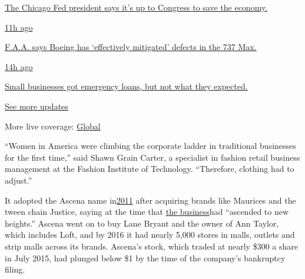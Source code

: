 \href{https://www.nytimes3xbfgragh.onion/live/2020/08/03/business/stock-market-today-coronavirus?action=click\&pgtype=Article\&state=default\&region=MAIN_CONTENT_1\&context=storylines_live_updates\#the-chicago-fed-president-says-its-up-to-congress-to-save-the-economy}{The
Chicago Fed president says it's up to Congress to save the economy.}

\href{https://www.nytimes3xbfgragh.onion/live/2020/08/03/business/stock-market-today-coronavirus?action=click\&pgtype=Article\&state=default\&region=MAIN_CONTENT_1\&context=storylines_live_updates\#faa-says-boeing-has-effectively-mitigated-defects-in-the-737-max}{11h
ago}

\href{https://www.nytimes3xbfgragh.onion/live/2020/08/03/business/stock-market-today-coronavirus?action=click\&pgtype=Article\&state=default\&region=MAIN_CONTENT_1\&context=storylines_live_updates\#faa-says-boeing-has-effectively-mitigated-defects-in-the-737-max}{F.A.A.
says Boeing has `effectively mitigated' defects in the 737 Max.}

\href{https://www.nytimes3xbfgragh.onion/live/2020/08/03/business/stock-market-today-coronavirus?action=click\&pgtype=Article\&state=default\&region=MAIN_CONTENT_1\&context=storylines_live_updates\#small-businesses-got-emergency-loans-but-not-what-they-expected}{14h
ago}

\href{https://www.nytimes3xbfgragh.onion/live/2020/08/03/business/stock-market-today-coronavirus?action=click\&pgtype=Article\&state=default\&region=MAIN_CONTENT_1\&context=storylines_live_updates\#small-businesses-got-emergency-loans-but-not-what-they-expected}{Small
businesses got emergency loans, but not what they expected.}

\href{https://www.nytimes3xbfgragh.onion/live/2020/08/03/business/stock-market-today-coronavirus?action=click\&pgtype=Article\&state=default\&region=MAIN_CONTENT_1\&context=storylines_live_updates}{See
more updates}

More live coverage:
\href{https://www.nytimes3xbfgragh.onion/2020/08/03/world/coronavirus-covid-19.html?action=click\&pgtype=Article\&state=default\&region=MAIN_CONTENT_1\&context=storylines_live_updates}{Global}

``Women in America were climbing the corporate ladder in traditional
businesses for the first time,'' said Shawn Grain Carter, a specialist
in fashion retail business management at the Fashion Institute of
Technology. ``Therefore, clothing had to adjust.''

It adopted the Ascena name
in\href{https://www.sec.gov/Archives/edgar/data/1498301/000093041311000020/c63666_ex99-1.htm}{2011}
after acquiring brands like Maurices and the tween chain Justice, saying
at the time that
\href{https://ascenaretailgroupinc.gcs-web.com/node/8851/html}{the
business}had ``ascended to new heights.'' Ascena went on to buy Lane
Bryant and the owner of Ann Taylor, which includes Loft, and by 2016 it
had nearly 5,000 stores in malls, outlets and strip malls across its
brands. Ascena's stock, which traded at nearly \$300 a share in July
2015, had plunged below \$1 by the time of the company's bankruptcy
filing.

